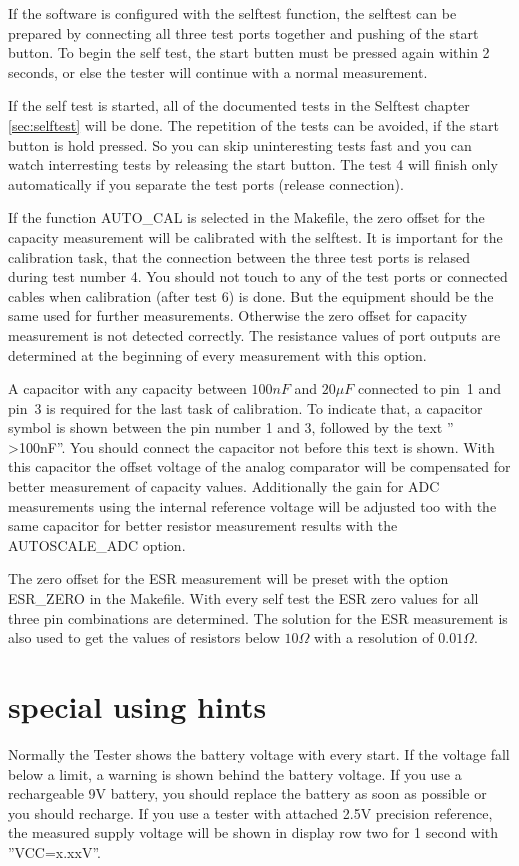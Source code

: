 If the software is configured with the selftest function, the selftest can be prepared by connecting all three
test ports together and pushing of the start button.
To begin the self test, the start butten must be pressed again within 2 seconds, or else the tester will continue
with a normal measurement.

If the self test is started, all of the documented tests in the Selftest chapter \ref{sec:selftest} will be done.
The repetition of the tests can be avoided, if the start button is hold pressed.
So you can skip uninteresting tests fast and you can watch interresting tests by releasing the start button.
The test 4 will finish only automatically if you separate the test ports (release connection).

If the function AUTO\_CAL is selected in the Makefile, 
the zero offset for the capacity measurement will be calibrated with the selftest.
It is important for the calibration task, that the connection between the three test ports is relased 
during test number 4. 
You should not touch to any of the test ports or connected cables when calibration (after test 6) is done.
But the equipment should be the same used for further measurements. Otherwise the zero offset for
capacity measurement is not detected correctly.
The resistance values of port outputs are determined at the beginning of every measurement with this option.

A capacitor with any capacity between \(100 nF\) and \(20 \mu F\) connected to pin~1 and pin~3 is
required for the last task of calibration.
To indicate that, a capacitor symbol is shown between the pin number 1 and 3, followed by the text '' \textgreater 100nF''.
You should connect the capacitor not before this text is shown.
With this capacitor the offset voltage of the analog comparator will be compensated for better measurement
of capacity values.  
Additionally the gain for ADC measurements using the internal reference voltage will be adjusted too 
with the same capacitor for better resistor measurement results with the AUTOSCALE\_ADC option.

The zero offset for the ESR measurement will be preset with the option ESR\_ZERO in the Makefile.
With every self test the ESR zero values for all three pin combinations are determined.
The solution for the ESR measurement is also used to get the values of resistors below \(10 \Omega\) with
a resolution of \(0.01 \Omega\).


\section{special using hints}
Normally the Tester shows the battery voltage with every start. If the voltage fall below a limit,
a warning is shown behind the battery voltage. If you use a rechargeable 9V battery, you should replace
the battery as soon as possible or you should recharge.
If you use a tester with attached 2.5V precision reference, the measured supply voltage will be shown
in display row two for 1 second with ''VCC=x.xxV''.

